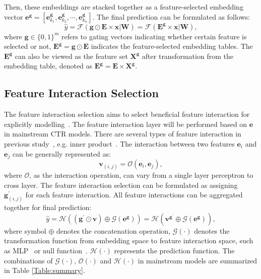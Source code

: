 \documentclass[sigconf]{acmart}
\begin{document}
Then, these embeddings are stacked together as a feature-selected embedding vector $\mathbf{e}^\mathbf{g} = [\mathbf{e}_{k_1}^\mathbf{g}, \mathbf{e}_{k_2}^\mathbf{g}, \cdots, \mathbf{e}_{k_n}^\mathbf{g}]$. The final prediction can be formulated as follows:
\begin{equation}
\label{eq:fs}
    \hat{y} = \mathcal{F}(\mathbf{g} \odot \mathbf{E} \times \mathbf{x}|\mathbf{W}) = \mathcal{F}(\mathbf{E}^{\mathbf{g}} \times \mathbf{x}|\mathbf{W}),
\end{equation}
where $\mathbf{g}\in\{0,1\}^{m}$ refers to gating vectors indicating whether certain feature is selected or not, $\mathbf{E}^\mathbf{g} = \mathbf{g} \odot \mathbf{E}$ indicates the feature-selected embedding tables. The $\mathbf{E}^\mathbf{g}$ can also be viewed as the feature set $\mathbf{X}^\mathbf{g}$ after transformation from the embedding table, denoted as $\mathbf{E}^\mathbf{g} = \mathbf{E} \times \mathbf{X}^\mathbf{g}$.


\subsection{Feature Interaction Selection}
\label{sec:method_fis}

The feature interaction selection aims to select beneficial feature interaction for explicitly modelling~\cite{OptInter, AutoFIS}. The feature interaction layer will be performed based on $\mathbf{e}$ in mainstream CTR models. There are several types of feature interaction in previous study~\cite{AutoFeature}, e.g. inner product~\cite{DeepFM}. The interaction between two features $\mathbf{e}_i$ and $\mathbf{e}_j$ can be generally represented as:
\begin{equation}
    \mathbf{v}_{(i,j)} = \mathcal{O}(\mathbf{e}_i, \mathbf{e}_j),
\end{equation}
where $\mathcal{O}$, as the interaction operation, can vary from a single layer perceptron to cross layer\cite{DCN}. The feature interaction selection can be formulated as assigning $\mathbf{g}^{'}_{(i,j)}$ for each feature interaction. All feature interactions can be aggregated together for final prediction:
\begin{equation}
    \hat{y} = \mathcal{H}((\mathbf{g}^{'} \odot \mathbf{v}) \oplus \mathcal{G}(\mathbf{e}^\mathbf{g})) = \mathcal{H}(\mathbf{v}^{\mathbf{g}^{'}} \oplus \mathcal{G}(\mathbf{e}^\mathbf{g})),
    \label{eq:aggregation}
\end{equation}
where symbol $\oplus$ denotes the concatenation operation, $\mathcal{G}(\cdot)$ denotes the transformation function from embedding space to feature interaction space, such as MLP~\cite{DeepFM,DCN} or null function~\cite{IPNN}. $\mathcal{H}(\cdot)$ represents the prediction function. The combinations of $\mathcal{G}(\cdot)$, $\mathcal{O}(\cdot)$ and $\mathcal{H}(\cdot)$ in mainstream models are summarized in Table \ref{Table:summary}.
\end{document}
